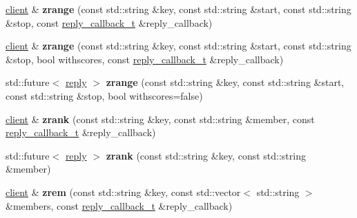 \begin{DoxyCompactItemize}
\hyperlink{classcpp__redis_1_1client}{client} \& {\bfseries zrange} (const std\+::string \&key, const std\+::string \&start, const std\+::string \&stop, const \hyperlink{classcpp__redis_1_1client_a061a1140d36d2eaeda82b09a0bb3f9f2}{reply\+\_\+callback\+\_\+t} \&reply\+\_\+callback)
\item 
\mbox{\label{classcpp__redis_1_1client_a3768026508c4c2e28c600bf7be54b4a1}} 
\hyperlink{classcpp__redis_1_1client}{client} \& {\bfseries zrange} (const std\+::string \&key, const std\+::string \&start, const std\+::string \&stop, bool withscores, const \hyperlink{classcpp__redis_1_1client_a061a1140d36d2eaeda82b09a0bb3f9f2}{reply\+\_\+callback\+\_\+t} \&reply\+\_\+callback)
\item 
\mbox{\label{classcpp__redis_1_1client_aaaaf7f2d11f02bc7709be1b2a654894d}} 
std\+::future$<$ \hyperlink{classcpp__redis_1_1reply}{reply} $>$ {\bfseries zrange} (const std\+::string \&key, const std\+::string \&start, const std\+::string \&stop, bool withscores=false)
\item 
\mbox{\label{classcpp__redis_1_1client_a5563d5240de4bbdbf6ed5dd8cc92a67a}} 
\hyperlink{classcpp__redis_1_1client}{client} \& {\bfseries zrank} (const std\+::string \&key, const std\+::string \&member, const \hyperlink{classcpp__redis_1_1client_a061a1140d36d2eaeda82b09a0bb3f9f2}{reply\+\_\+callback\+\_\+t} \&reply\+\_\+callback)
\item 
\mbox{\label{classcpp__redis_1_1client_acf680674a3944a3baaa36f888250610e}} 
std\+::future$<$ \hyperlink{classcpp__redis_1_1reply}{reply} $>$ {\bfseries zrank} (const std\+::string \&key, const std\+::string \&member)
\item 
\mbox{\label{classcpp__redis_1_1client_ae33a0ea1127a5da870db4354fad2bd10}} 
\hyperlink{classcpp__redis_1_1client}{client} \& {\bfseries zrem} (const std\+::string \&key, const std\+::vector$<$ std\+::string $>$ \&members, const \hyperlink{classcpp__redis_1_1client_a061a1140d36d2eaeda82b09a0bb3f9f2}{reply\+\_\+callback\+\_\+t} \&reply\+\_\+callback)
\item 
\mbox{\label{classcpp__redis_1_1client_aff2e5ec7005f76869fad79c4e8bd68c8}} 

\end{DoxyCompactItemize}
